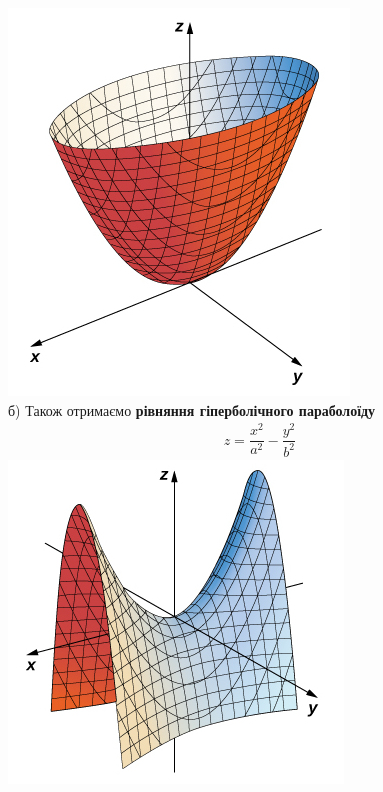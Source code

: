 \documentclass[a4paper, 14pt]{extarticle}
\def\bigline{\vspace{5mm}\\}
\begin{document}
\includegraphics[scale=1]{elliptic-paraboloid.jpeg}
\\
б) Також отримаємо \textbf{рівняння гіперболічного параболоїду}
\begin{align*}
z = \dfrac{x^2}{a^2} - \dfrac{y^2}{b^2}
\end{align*}
\includegraphics[scale=1]{hyperbolic-paraboloid.jpeg}
\bigline
\end{document}
